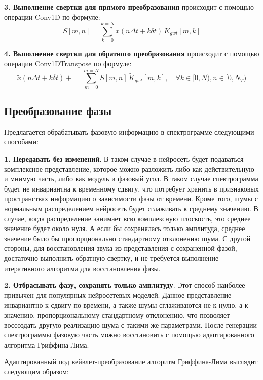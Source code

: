 \textbf{3. Выполнение свертки для прямого преобразования} происходит с помощью операции Conv1D по формуле:
\begin{equation}
  S[m, n] = \sum \limits_{k=0}^{k=N} x(n\Delta t + k\delta t) \, K_{gwt}[m, k]
\end{equation}

\textbf{4. Выполнение свертки для обратного преобразования} происходит с помощью операции Conv1DTranspose по формуле:
\begin{equation}
  \tilde{x}(n\Delta t + k\delta t) \mathrel{+}= \sum \limits_{m=0}^{m=N} S[m, n] \, \tilde{K}_{gwt}[m, k], \quad 
  \forall k \in [0, N), n \in [0, N_T)
\end{equation}


\subsection{Преобразование фазы}
Предлагается обрабатывать фазовую информацию в спектрограмме следующими способами:

\textbf{1. Передавать без изменений}. В таком случае в нейросеть будет подаваться комплексное представление, 
которое можно разложить либо как действительную и мнимую часть, либо как модуль и фазовый угол.
В таком случае спектрограмма будет не инвариантна к временному сдвигу, что потребует хранить в признаковых пространствах информацию 
о зависимости фазы от времени. Кроме того, шумы с нормальным распределением нейросеть будет сглаживать к среднему значению.
В случае, когда распределение занимает всю комплексную плоскость, это среднее значение будет около нуля. А если бы сохранялась только амплитуда, 
среднее значение было бы пропорционально стандартному отклонению шума.
С другой стороны, для восстановления звука из представления с сохраненной фазой, достаточно выполнить обратную свертку, 
и не требуется выполнение итеративного алгоритма для восстановления фазы.

\textbf{2. Отбрасывать фазу, сохранять только амплитуду}. Этот способ наиболее привычен для популярных нейросетевых моделей. 
Данное представление инвариантно к сдвигу по времени, а также шумы сглаживаются не к нулю, а к значению, 
пропорциональному стандартному отклонению, что позволяет воссоздать другую реализацию шума с такими же параметрами.
После генерации спектрограммы фазовую часть можно восстановить с помощью адаптированного алгоритма Гриффина-Лима.

Адаптированный под вейвлет-преобразование алгоритм Гриффина-Лима выглядит следующим образом:

